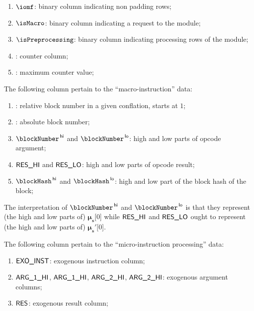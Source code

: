 \begin{enumerate}
	\item $\iomf$:
		binary column indicating non padding rows;
	\item $\isMacro$:
		binary column indicating a request to the \blockHashMod{} module;
	\item $\isPreprocessing$:
		binary column indicating processing rows of the \blockHashMod{} module;
	\item \ct:
		counter column;
	\item \ctMax:
		maximum counter value;
\end{enumerate}
The following column pertain to the ``macro-instruction'' data:
\begin{enumerate}[resume]
	\item \relBlock{}: 
		relative block number in a given conflation, starts at $1$;
	\item \absBlock{}:
		absolute block number;
	\item $\blockNumber\high$ and $\blockNumber\low$: 
		high and low parts of  opcode argument;
	\item $\textsf{RES}\textsf{\_HI}$ and $\textsf{RES}\textsf{\_LO}$:
		high and low parts of  opcode result;
	\item $\blockHash\high$ and $\blockHash\low$: 
		high and low part of the block hash of the block;
\end{enumerate}
\saNote{}
The interpretation of $\blockNumber\high$ and $\blockNumber\low$ is that they represent
(the high and low parts of) $\bm{\mu}_\textbf{s}\big[0\big]$
while $\textsf{RES}\textsf{\_HI}$ and $\textsf{RES}\textsf{\_LO}$ ought to represent
(the high and low parts of) $\bm{\mu}_\textbf{s}'\big[0\big]$.

\noindent The following column pertain to the ``micro-instruction processing'' data:
\begin{enumerate}[resume]
	\item $\textsf{EXO\_}\textsf{INST}$:
		exogenous instruction column;
	\item $\textsf{ARG}\textsf{\_1}\textsf{\_HI}$, $\textsf{ARG}\textsf{\_1}\textsf{\_HI}$, $\textsf{ARG}\textsf{\_2}\textsf{\_HI}$, $\textsf{ARG}\textsf{\_2}\textsf{\_HI}$:
		exogenous argument columns;
	\item $\textsf{RES}$:
		exogenous result column;
\end{enumerate}
